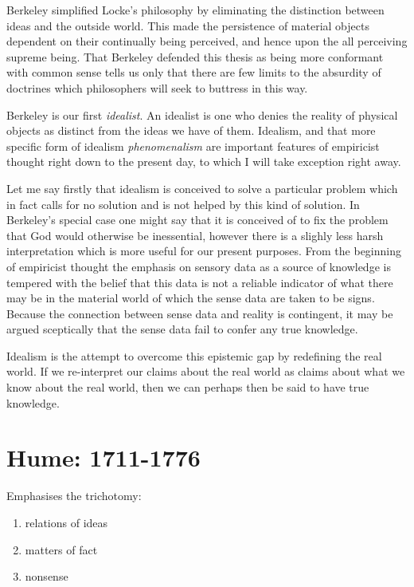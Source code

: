 Berkeley simplified Locke's philosophy by eliminating the distinction between ideas and the outside world.
This made the persistence of material objects dependent on their continually being perceived, and hence upon the all perceiving supreme being.
That Berkeley defended this thesis as being more conformant with common sense tells us only that there are few limits to the absurdity of doctrines which philosophers will seek to buttress in this way.

Berkeley is our first {\it idealist}.
An idealist is one who denies the reality of physical objects as distinct from the ideas we have of them.
Idealism, and that more specific form of idealism {\it phenomenalism} are important features of empiricist thought right down to the present day, to which I will take exception right away.

Let me say firstly that idealism is conceived to solve a particular problem which in fact calls for no solution and is not helped by this kind of solution.
In Berkeley's special case one might say that it is conceived of to fix the problem that God would otherwise be inessential, however there is a slighly less harsh interpretation which is more useful for our present purposes.
From the beginning of empiricist thought the emphasis on sensory data as a source of knowledge is tempered with the belief that this data is not a reliable indicator of what there may be in the material world of which the sense data are taken to be signs.
Because the connection between sense data and reality is contingent, it may be argued sceptically that the sense data fail to confer any true knowledge.

Idealism is the attempt to overcome this epistemic gap by redefining the real world.
If we re-interpret our claims about the real world as claims about what we know about the real world, then we can perhaps then be said to have true knowledge.


\section{Hume: 1711-1776}

Emphasises the trichotomy:
\begin{enumerate}
\item relations of ideas
\item matters of fact
\item nonsense
\end{enumerate}

